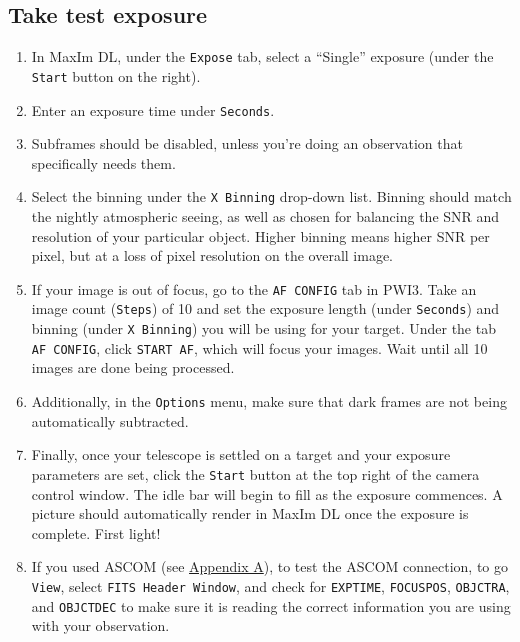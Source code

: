 \documentclass{article}
\begin{document}
	\subsection{Take test exposure}
	\label{sec:take-test-exposure}
	
	\begin{enumerate}
		
		\item In MaxIm DL, under the \texttt{Expose} tab, select a ``Single'' exposure (under the \texttt{Start} button on the right).
		
		\item Enter an exposure time under \texttt{Seconds}.
		
		\item Subframes should be disabled, unless you're doing an observation that specifically needs them.
		
		\item Select the binning under the \texttt{X Binning} drop-down list. Binning should match the nightly atmospheric seeing, as well as chosen for balancing the SNR and resolution of your particular object. Higher binning means higher SNR per pixel, but at a loss of pixel resolution on the overall image.
		
		\item If your image is out of focus, go to the \texttt{AF CONFIG} tab in PWI3. Take an image count (\texttt{Steps}) of 10 and set the exposure length (under \texttt{Seconds}) and binning (under \texttt{X Binning}) you will be using for your target. Under the tab \texttt{AF CONFIG}, click \texttt{START AF}, which will focus your images. Wait until all 10 images are done being processed.
		
		\item Additionally, in the \texttt{Options} menu, make sure that dark frames are not being automatically subtracted.
		
		\item Finally, once your telescope is settled on a target and your exposure parameters are set, click the \texttt{Start} button at the top right of the camera control window. The idle bar will begin to fill as the exposure commences. A picture should automatically render in MaxIm DL once the exposure is complete. First light!
		
		\item If you used ASCOM (see \hyperref[sec:set-up-ascom]{Appendix A}), to test the ASCOM connection, to go \texttt{View}, select \texttt{FITS Header Window}, and check for \texttt{EXPTIME}, \texttt{FOCUSPOS}, \texttt{OBJCTRA}, and \texttt{OBJCTDEC} to make sure it is reading the correct information you are using with your observation. 
		
	\end{enumerate}
	
\end{document}
